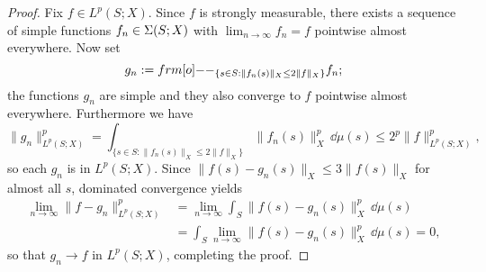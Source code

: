 \begin{proof}

  Fix $f \in L^p(S;X)$.
  Since $f$ is strongly measurable, there exists a sequence of simple functions $f_n \in \Sigma(S;X)$ with $\lim_{n \to \infty} f_n = f$ pointwise almost everywhere.
  Now set
  \begin{equation*}
    g_n := \1_{ \{s \in S : \|f_n(s)\|_X \leq 2\|f\|_X \} } f_n;
  \end{equation*}
  the functions $g_n$ are simple and they also converge to $f$ pointwise almost everywhere.
  Furthermore we have
  \begin{equation*}
    \|g_n\|_{L^p(S;X)}^p = \int_{\{s \in S : \|f_n(s)\|_X \leq 2\|f\|_X \} } \|f_n(s)\|_X^p \, \dd\mu(s) \leq 2^p \|f\|_{L^p(S;X)}^p,
  \end{equation*}
  so each $g_n$ is in $L^p(S;X)$.
  Since $\|f(s) - g_n(s)\|_X \leq 3\|f(s)\|_X$ for almost all $s$, dominated convergence yields
  \begin{equation*}
    \begin{aligned}
      \lim_{n \to \infty} \|f - g_n\|_{L^p(S;X)}^p &= \lim_{n \to \infty} \int_S \|f(s) - g_n(s)\|_{X}^p \, \dd\mu(s) \\
      &= \int_S \lim_{n \to \infty}  \|f(s) - g_n(s)\|_{X}^p \, \dd\mu(s) = 0,
    \end{aligned}
  \end{equation*}
  so that $g_n \to f$ in $L^p(S;X)$, completing the proof.
\end{proof}



